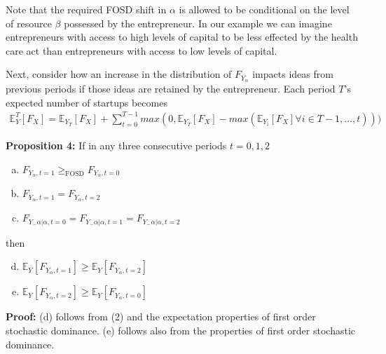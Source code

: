 \documentclass[12pt]{article}
\begin{document}
Note that the required FOSD shift in $\alpha$ is allowed to be conditional on the level of resource $\beta$ possessed by the entrepreneur. In our example we can imagine entrepreneurs with access to high levels of capital to be less effected by the health care act than entrepreneurs with access to low levels of capital.  

Next, consider how an increase in the distribution of $F_{Y_\alpha}$ impacts ideas from previous periods if those ideas are retained by the entrepreneur. Each period $T$'s expected number of startups becomes
\begin{align}
\mathbb{E}^T_Y[F_{X}] = \mathbb{E}_{Y_T}[F_{X}] + \sum_{t=0}^{T-1} max(0,\mathbb{E}_{Y_T}[F_{X}] - max(\mathbb{E}_{Y_i}[F_{X}] \forall i \in T{-}1,\dots,t)))
\end{align}

\textbf{Proposition 4:} If in any three consecutive periods $t=0,1,2$
\begin{enumerate}[(a)]
\item $F_{Y_\alpha,t=1} \mathop{\ge}_{\text{FOSD}} F_{Y_\alpha,t=0} $
\item $F_{Y_\alpha,t=1} = F_{Y_\alpha,t=2} $
\item $F_{Y_-\alpha|\alpha,t=0} = F_{Y_-\alpha|\alpha,t=1} =F_{Y_-\alpha|\alpha,t=2}$
\end{enumerate}
then
\begin{enumerate}[(a)]
\setcounter{enumi}{3}
\item $\mathbb{E}_{Y}[F_{Y_\alpha,t=1}] \ge \mathbb{E}_{Y}[F_{Y_\alpha,t=2}]$
\item $\mathbb{E}_{Y}[F_{Y_\alpha,t=2}] \ge \mathbb{E}_{Y}[F_{Y_\alpha,t=0}]$
\end{enumerate}

\textbf{Proof:} (d) follows from (2) and the expectation properties of first order stochastic dominance. (e) follows also from the properties of first order stochastic dominance.
\end{document}
